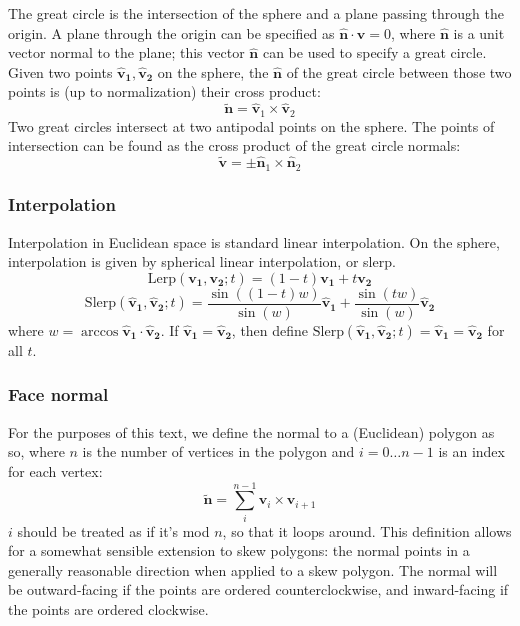 \documentclass{amsart}[12pt]
\begin{document}
The great circle is the intersection of the sphere
and a plane passing through the origin. A plane through the origin can be
specified as $\hat{\mathbf n} \cdot \mathbf v = 0$, where $\hat{\mathbf n}$ is
a unit vector normal to the plane; this vector $\hat{\mathbf n}$ can be used to
specify a great circle. Given two points $\mathbf{\hat{v}_1, \hat{v}_2}$ on the
sphere, the $\hat{\mathbf n}$ of the great circle between those two points is
(up to normalization) their cross product:
\begin{equation}
  \mathbf{\widetilde{n}} = \mathbf{\hat{v}}_1 \times \mathbf{\hat{v}}_2
\end{equation}
Two great circles intersect at two antipodal points on the sphere. The points
of intersection can be found as the cross product of the great circle normals:
\begin{equation}
  \mathbf{\widetilde{v}} = \pm \mathbf{\hat{n}}_1 \times \mathbf{\hat{n}}_2
\end{equation}

\subsubsection{Interpolation}
Interpolation in Euclidean space is standard linear interpolation. On the
sphere, interpolation is given by spherical linear interpolation, or slerp.
\begin{equation}
\mathrm{Lerp}(\mathbf{v_1}, \mathbf{v_2}; t) =
       (1-t) \mathbf{v_1} + t \mathbf{v_2}
\end{equation}
\begin{equation}
\mathrm{Slerp}(\mathbf{\hat{v}_1}, \mathbf{\hat{v}_2}; t) =
        \frac{\sin ((1-t)w)}{\sin (w)} \mathbf{\hat{v}_1} +
       \frac{\sin (tw)}{\sin (w)} \mathbf{\hat{v}_2}
\end{equation}
where $w = \arccos \mathbf{\hat{v}_1} \cdot \mathbf{\hat{v}_2}$. If $\mathbf{\hat{v}_1} = \mathbf{\hat{v}_2}$, then define $\mathrm{Slerp}(\mathbf{\hat{v}_1}, \mathbf{\hat{v}_2}; t) =
\mathbf{\hat{v}_1} = \mathbf{\hat{v}_2}$ for all $t$.

\subsubsection{Face normal}
For the purposes of this text, we define the normal to a (Euclidean) polygon as
so, where $n$ is the number of vertices in the polygon and
$i = 0 \dots n-1$ is an index for each vertex:
\begin{equation}
  \mathbf{\widetilde{n}} =
  \sum^{n-1}_i \mathbf{v}_i \times \mathbf{v}_{i+1}
\end{equation}
$i$ should be treated as if it's mod $n$, so that it loops around.
This definition allows for a somewhat sensible extension to skew polygons:
the normal points in a generally reasonable direction when applied to a skew
polygon. The normal will be outward-facing if the points are ordered
counterclockwise, and inward-facing if the points are ordered clockwise.
\end{document}
